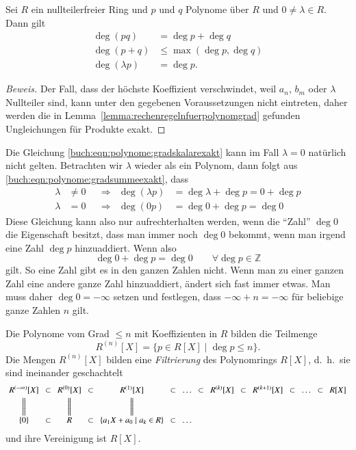 \begin{lemma}
Sei $R$ ein nullteilerfreier Ring und $p$ und $q$ Polynome über $R$
und $0\ne \lambda\in R$.
Dann gilt
\begin{align}
\deg(pq) &= \deg p + \deg q
\label{buch:eqn:polynome:gradsummeexakt}
\\
\deg(p+q) &\le \max(\deg p, \deg q)
\label{buch:eqn:polynome:gradproduktexakt}
\\
\deg(\lambda p) &= \deg p.
\label{buch:eqn:polynome:gradskalarexakt}
\end{align}
\end{lemma}

\begin{proof}[Beweis]
Der Fall, dass der höchste Koeffizient verschwindet, weil $a_n$, $b_m$
oder $\lambda$ Nullteiler sind, kann unter den gegebenen Voraussetzungen
nicht eintreten, daher werden die in
Lemma~\ref{lemma:rechenregelnfuerpolynomgrad} gefunden Ungleichungen
für Produkte exakt.
\end{proof}

Die Gleichung
\eqref{buch:eqn:polynome:gradskalarexakt}
kann im Fall $\lambda=0$ natürlich nicht gelten.
Betrachten wir $\lambda$ wieder als ein Polynom, dann folgt aus
\eqref{buch:eqn:polynome:gradsummeexakt}, dass
\[
\begin{aligned}
\lambda&\ne 0  &&\Rightarrow& \deg (\lambda p) &= \deg\lambda + \deg p = 0+\deg p
\\
\lambda&=0     &&\Rightarrow& \deg (0 p) &= \deg 0 + \deg p = \deg 0
\end{aligned}
\]
Diese Gleichung kann also nur aufrechterhalten werden, wenn die ``Zahl'' $\deg 0$ die Eigenschaft besitzt, dass man immer noch $\deg 0$ bekommt,
wenn man irgend eine Zahl $\deg p$ hinzuaddiert. Wenn also
\[\deg 0 + \deg p = \deg 0 \qquad \forall \deg p \in \mathbb Z\]
gilt.
So eine Zahl gibt es in den ganzen Zahlen nicht.
Wenn man zu einer ganzen Zahl eine andere ganze Zahl hinzuaddiert, ändert sich fast immer etwas.
Man muss daher $\deg 0 = -\infty$ setzen und festlegen, dass
$-\infty + n = -\infty$ für beliebige ganze Zahlen $n$ gilt.

\begin{definition}
\label{buch:def:definitionen:polynomfilterung}
Die Polynome vom Grad $\le n$ mit Koeffizienten in $R$
bilden die Teilmenge
\[
R^{(n)}[X]
=
\{ p\in R[X] \mid \deg p \le n\}.
\]
Die Mengen $R^{(n)}[X]$ bilden eine {\em Filtrierung} des Polynomrings
$R[X]$, d.~h.~sie sind ineinander geschachtelt
\[
\arraycolsep=4pt
\begin{array}{ccccccccccccccc}
R^{(-\infty)}[X] & \subset
	& R^{(0)}[X] & \subset
		& R^{(1)}[X] & \subset & \dots & \subset
			& R^{(k)}[X] & \subset
				& R^{(k+1)}[X] & \subset & \dots & \subset
					& R[X]\\[3pt]
\bigg\| &
	&\bigg\| &
		&\bigg\| & & &
			&&
				&& & &
					&
\\[3pt]
\{0\} & \subset
	& R & \subset
		& \{a_1X+a_0 \mid a_k\in R\} & \subset & \dots &
\end{array}
\]
und ihre Vereinigung ist $R[X]$.
\end{definition}

